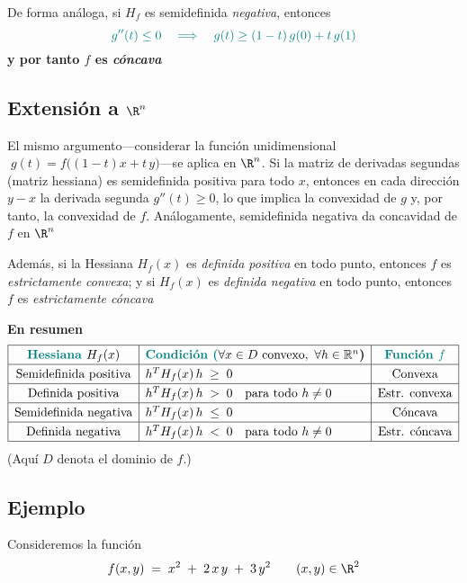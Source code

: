 \documentclass{article}
\begin{document}
De forma análoga, si \(H_f\) es semidefinida \emph{negativa}, entonces
\[
\color{teal}
g''(t)\le0
\quad\Longrightarrow\quad
g(t)\ge(1-t)\,g(0)+t\,g(1)
\]
\textbf{\color{teal}y por tanto \(f\) es \emph{cóncava}}

\subsection*{Extensión a $\R^n$}
El mismo argumento—considerar la función unidimensional  
\(\;g(t)=f\bigl((1-t)x + t\,y\bigr)\)—se aplica en \(\R^n\). Si la matriz de derivadas segundas (matriz hessiana) es semidefinida positiva para todo \(x\), entonces en cada dirección \(y-x\)  
la derivada segunda \(g''(t)\ge0\), lo que implica la convexidad de \(g\)  
y, por tanto, la convexidad de \(f\). Análogamente, semidefinida negativa  
da concavidad de \(f\) en \(\R^n\)

\noindent Además, si la Hessiana \(H_f(x)\) es \emph{definida positiva} en todo punto, entonces \(f\) es \emph{estrictamente convexa}; y si \(H_f(x)\) es \emph{definida negativa} en todo punto, entonces \(f\) es \emph{estrictamente cóncava}

\noindent\textbf{En resumen}
\[
\renewcommand{\arraystretch}{1.25}
\begin{array}{|c|l|c|}
\hline
\textbf{\color{teal}Hessiana } H_f(x)
  & \textbf{\color{teal}Condición (}\forall x\in D\ \text{convexo},\ \forall h\in\mathbb{R}^n\textbf{)}
  & \textbf{\color{teal}Función \(f\)} \\ \hline
\text{Semidefinida positiva}
  & h^{T} H_f(x)\, h \;\ge\; 0
  & \text{Convexa} \\ \hline
\text{Definida positiva}
  & h^{T} H_f(x)\, h \;>\; 0 \quad \text{para todo } h\neq 0
  & \text{Estr. convexa} \\ \hline
\text{Semidefinida negativa}
  & h^{T} H_f(x)\, h \;\le\; 0
  & \text{Cóncava} \\ \hline
\text{Definida negativa}
  & h^{T} H_f(x)\, h \;<\; 0 \quad \text{para todo } h\neq 0
  & \text{Estr. cóncava} \\ \hline
\end{array}
\]
{\small (Aquí \(D\) denota el dominio de \(f\).)}


\subsection*{Ejemplo}

Consideremos la función
\[
f(x,y) \;=\; x^2 \;+\; 2\,x\,y \;+\; 3\,y^2
\qquad (x,y)\in\R^2
\]
\end{document}
